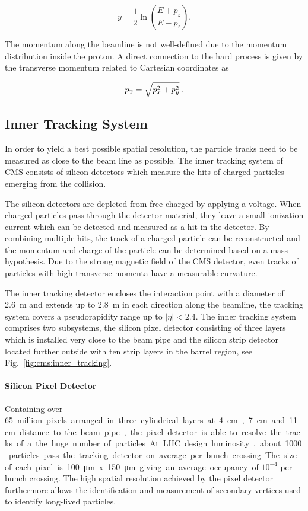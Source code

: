 \begin{equation*}
    y = \frac{1}{2} \ln \left( \frac{E + p_z}{E - p_z} \right).
\end{equation*}

The momentum along the beamline is not well-defined due to the momentum
distribution inside the proton. A direct connection to the hard process is given
by the transverse momentum \pt related to Cartesian coordinates as

\begin{equation*}
    \pt = \sqrt{p_x^2 + p_y^2}\,.
\end{equation*}

\subsection{Inner Tracking System}

In order to yield a best possible spatial resolution, the particle tracks need to be
measured as close to the beam line as possible. The inner tracking system of CMS
consists of silicon detectors which measure the hits of charged
particles emerging from the collision. 

The silicon detectors are depleted from free charged by applying a voltage. When
charged particles pass through the detector material, they leave a small
ionization current which can be detected and measured as a hit in the detector.
By combining multiple hits, the track of a charged particle can be reconstructed
and the momentum and charge of the particle can be determined based on a mass
hypothesis. Due to the strong magnetic field of the CMS detector, even tracks of
particles with high transverse momenta have a measurable curvature.
 
The inner tracking detector encloses the interaction point with a diameter of
\SI{2.6}{\meter} and extends up to \SI{2.8}{\meter} in each direction along the
beamline, the tracking system covers a pseudorapidity range up to $|\eta| <
2.4$. The inner tracking system comprises two subsystems, the silicon pixel
detector consisting of three layers which is installed very close to the beam
pipe and the silicon strip detector located further outside with ten strip
layers in the barrel region, see Fig.~\ref{fig:cms:inner_tracking}. 

\paragraph{Silicon Pixel Detector} Containing over \SI{65} million pixels
arranged in three cylindrical layers at \SI{4}{\centi\meter},
\SI{7}{\centi\meter} and \SI{11}{\centi\meter} distance to the beam pipe, the
pixel detector is able to resolve the tracks of a the huge number of particles.
At LHC design luminosity, about 1000 particles pass the tracking detector on
average per bunch crossing. The size of each pixel is \SI{100}{\micro \meter} x
\SI{150}{\micro \meter} giving an average occupancy of $10^{-4}$ per bunch
crossing. The high spatial resolution achieved by the pixel detector furthermore
allows the identification and measurement of secondary vertices used to identify
long-lived particles.

